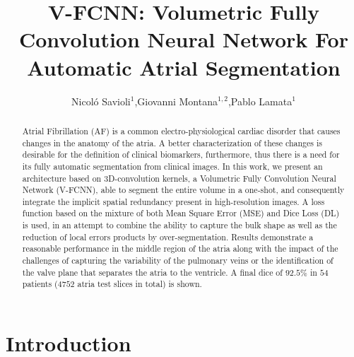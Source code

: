 \documentclass{llncs}
\begin{document}
\pagestyle{headings}  %
\mainmatter              %
\title{V-FCNN: Volumetric Fully Convolution Neural Network For Automatic Atrial Segmentation}

\author{Nicol\'o Savioli$^{1}$,Giovanni Montana$^{1,2}$,Pablo Lamata$^{1}$}%





\maketitle

\begin{abstract}

Atrial Fibrillation (AF) is a common electro-physiological cardiac disorder that causes changes in the anatomy of the atria. A better characterization of these changes is desirable for the definition of clinical biomarkers, furthermore, thus there is a need for its fully automatic segmentation from clinical images.
In this work, we present an architecture based on 3D-convolution kernels, a Volumetric Fully Convolution Neural Network (V-FCNN),
able to segment the entire volume in a one-shot, and consequently integrate the implicit spatial redundancy present in high-resolution images. A loss function based on the mixture of both Mean Square Error (MSE) and Dice Loss (DL) is used, in an attempt to combine the ability to capture the bulk shape as well as the reduction of local errors products by over-segmentation. Results demonstrate a reasonable performance in the middle region of the atria along with the impact of the challenges of capturing the variability of the pulmonary veins or the identification of the valve plane that separates the atria to the ventricle. A final dice of $92.5\%$ in $54$ patients ($4752$ atria test slices in total) is shown.

\end{abstract}


\section{Introduction}
\end{document}
